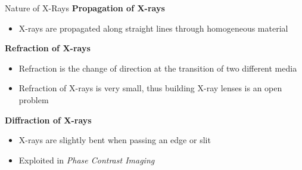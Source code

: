 \begin{frame}{Nature of X-Rays}
    \textbf{Propagation of X-rays}
    \begin{itemize}
        \item X-rays are propagated along straight lines through homogeneous material
    \end{itemize}
    \vspace{0.5cm}
    \textbf{Refraction of X-rays}
    \begin{itemize}
        \item Refraction is the change of direction at the transition of two different media
        \item Refraction of X-rays is very small, thus building X-ray lenses is an open problem
    \end{itemize}
    \vspace{0.5cm}
    \textbf{Diffraction of X-rays}
    \begin{itemize}
        \item X-rays are slightly bent when passing an edge or slit
        \item Exploited in \emph{Phase Contrast Imaging}
    \end{itemize}
\end{frame}




